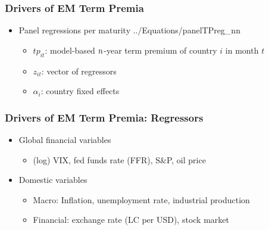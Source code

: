 \documentclass[12pt, aspectratio=169, xcolor=dvipsnames]{beamer} 			         %
\begin{document}
\begin{frame}[label=corr_10yr]
	
	
\end{frame}

\begin{frame}
	\frametitle{Drivers of EM Term Premia}
	\begin{itemize}
		\item Panel regressions per maturity
		 {../Equations/panelTPreg_nn}
		\vspace{-0.5cm}
		\begin{itemize}
			\item $tp_{it}$: model-based $n$-year term premium of country $i$ in month $t$
			\item $z_{it}$: vector of regressors
			\item $\alpha_{i}$: country fixed effects
		\end{itemize}
	\end{itemize}
\end{frame}

\begin{frame}
\frametitle{Drivers of EM Term Premia: Regressors}
\begin{itemize}
	\item Global financial variables
	\begin{itemize}
		\item (log) VIX, fed funds rate (FFR), S\&P, oil price
	\end{itemize}
	\item Domestic variables
	\begin{itemize}
		\item Macro: Inflation, unemployment rate, industrial production
		\item Financial: exchange rate (LC per USD), stock market
	\end{itemize}
\end{itemize}
\end{frame}
\end{document}
